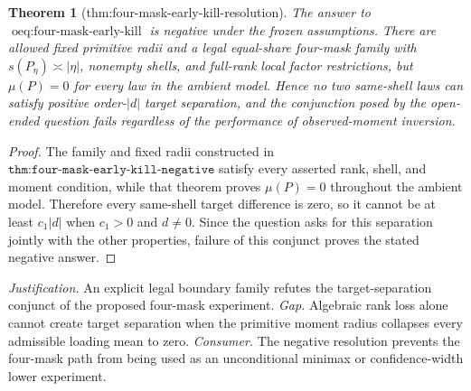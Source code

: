 \documentclass{article}
\newtheorem{theorem}{Theorem}
\begin{document}
\begin{theorem}[thm:four-mask-early-kill-resolution]\label{thm:four-mask-early-kill-resolution}
The answer to \(\operatorname{oeq:four\text{-}mask\text{-}early\text{-}kill}\) is negative under the frozen assumptions. There are allowed fixed primitive radii and a legal equal-share four-mask family with \(s(P_\eta)\asymp|\eta|\), nonempty shells, and full-rank local factor restrictions, but \(\mu(P)=0\) for every law in the ambient model. Hence no two same-shell laws can satisfy positive order-\(|d|\) target separation, and the conjunction posed by the open-ended question fails regardless of the performance of observed-moment inversion.
\end{theorem}
\begin{proof}
The family and fixed radii constructed in \(\texttt{thm:four-mask-early-kill-negative}\) satisfy every asserted rank, shell, and moment condition, while that theorem proves \(\mu(P)=0\) throughout the ambient model. Therefore every same-shell target difference is zero, so it cannot be at least \(c_1|d|\) when \(c_1>0\) and \(d\neq0\). Since the question asks for this separation jointly with the other properties, failure of this conjunct proves the stated negative answer.
\end{proof}
\par\smallskip\noindent \textit{Justification.} An explicit legal boundary family refutes the target-separation conjunct of the proposed four-mask experiment. \textit{Gap.} Algebraic rank loss alone cannot create target separation when the primitive moment radius collapses every admissible loading mean to zero. \textit{Consumer.} The negative resolution prevents the four-mask path from being used as an unconditional minimax or confidence-width lower experiment.
\end{document}
